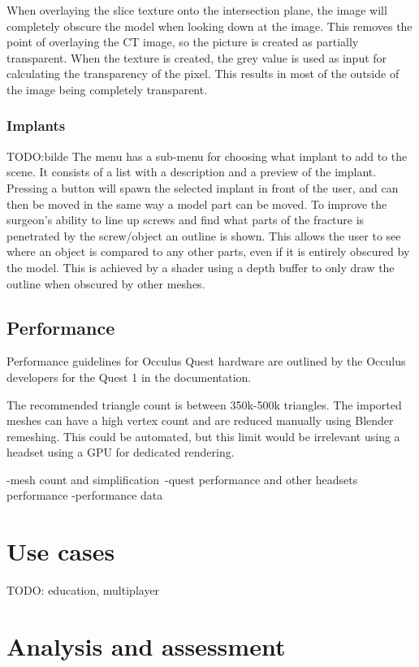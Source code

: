 \documentclass[a4paper]{report}
\begin{document}
When overlaying the slice texture onto the intersection plane, the image will completely obscure the model when looking down at the image. This removes the point of overlaying the CT image, so the picture is created as partially transparent. When the texture is created, the grey value is used as input for calculating the transparency of the pixel. This results in most of the outside of the image being completely transparent.

\subsection{Implants}
TODO:bilde
The menu has a sub-menu for choosing what implant to add to the scene. It consists of a list with a description and a preview of the implant. Pressing a button will spawn the selected implant in front of the user, and can then be moved in the same way a model part can be moved.
To improve the surgeon's ability to line up screws and find what parts of the fracture is penetrated by the screw/object an outline is shown. This allows the user to see where an object is compared to any other parts, even if it is entirely obscured by the model. This is achieved by a shader using a depth buffer to only draw the outline when obscured by other meshes\cite{technologies_unity_nodate-1}.

\section{Performance}
Performance guidelines for Occulus Quest hardware are outlined by the Occulus developers for the Quest 1 in the documentation\cite{noauthor_oculus_nodate}.

The recommended triangle count is between 350k-500k triangles\cite{noauthor_oculus_nodate}. The imported meshes can have a high vertex count and are reduced manually using Blender remeshing.
This could be automated, but this limit would be irrelevant using a headset using a GPU for dedicated rendering.


-mesh count and simplification\
-quest performance and other headsets performance
-performance data

\chapter{Use cases}\label{usecases}
TODO: education, multiplayer

\chapter{Analysis and assessment}\label{analysis and assessment}
\end{document}
